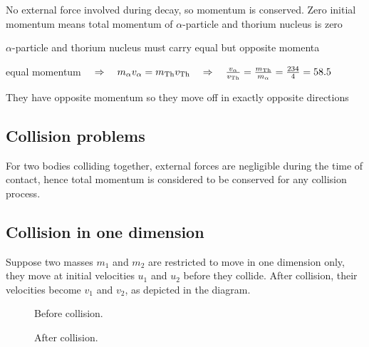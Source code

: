 \begin{soln}
No external force involved during decay, so momentum is conserved. Zero initial momentum means total momentum of $\alpha$-particle and thorium nucleus is zero

$\alpha$-particle and thorium nucleus must carry equal but opposite momenta

equal momentum $\quad \Rightarrow \quad m_\alpha v_\alpha = m_\text{Th} v_\text{Th} \quad \Rightarrow \quad \frac{v_\alpha}{v_\text{Th}} = \frac{m_\text{Th}}{m_\alpha} = \frac{234}{4}=58.5 $

They have opposite momentum so they move off in exactly opposite directions \end{soln}

\subsection{Collision problems}

For two bodies colliding together, external forces are negligible during the time of contact, hence total momentum is considered to be conserved for any collision process.

\subsection{Collision in one dimension}

Suppose two masses $m_1$ and $m_2$ are restricted to move in one dimension only, they move at initial velocities $u_1$ and $u_2$ before they collide. After collision, their velocities become $v_1$ and $v_2$, as depicted in the diagram.

\begin{figure}[!ht]
\centering
\begin{minipage}{0.45\textwidth}
	\begin{center}
		
		Before collision.
	\end{center}
\end{minipage}\hfil
\begin{minipage}{0.45\textwidth}
	\begin{center}
		
		After collision.
	\end{center}
\end{minipage}
\end{figure}


